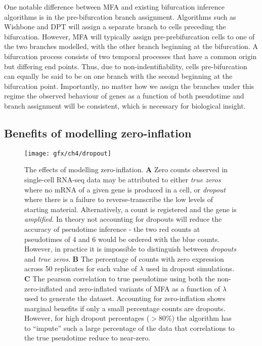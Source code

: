 One notable difference between MFA and existing bifurcation inference algorithms is in the pre-bifurcation branch assignment. Algorithms such as Wishbone and DPT will assign a separate branch to cells preceding the bifurcation. However, MFA will typically assign pre-prebifurcation cells to one of the two branches modelled, with the other branch beginning at the bifurcation. A bifurcation process consists of two temporal processes that have a common origin but differing end points. Thus, due to non-indentifiability, cells pre-bifurcation can equally be said to be on one branch with the second beginning at the bifurcation point. Importantly, no matter how we assign the branches under this regime the observed behaviour of genes as a function of both pseudotime and branch assignment will be consistent, which is necessary for biological insight.

\subsection{Benefits of modelling zero-inflation}

\begin{figure}
	\centering
	\texttt{[image: gfx/ch4/dropout]}
	\caption{The effects of modelling zero-inflation. {\normalfont
\textbf{A} Zero counts observed in single-cell RNA-seq data may be attributed to either \emph{true zeros} where no mRNA of a given gene is produced in a cell, or \emph{dropout} where there is a failure to reverse-transcribe the low levels of starting material. Alternatively, a count is registered and the gene is \emph{amplified}. In theory not accounting for dropouts will reduce the accuracy of pseudotime inference - the two red counts at pseudotimes of 4 and 6 would be ordered with the blue counts. However, in practice it is impossible to distinguish between \emph{dropouts} and \emph{true zeros}.
\textbf{B} The percentage of counts with zero expression across 50 replicates for each value of $\lambda$ used in dropout simulations.
\textbf{C} The pearson correlation to true pseudotime using both the non-zero-inflated and zero-inflated variants of MFA as a function of $\lambda$ used to generate the dataset. Accounting for zero-inflation shows marginal benefits if only a small percentage counts are dropouts. However, for high dropout percentages ($>80\%$) the algorithm has to ``impute'' such a large percentage of the data that correlations to the true pseudotime reduce to near-zero.
	}} \label{fig:dropout_results}
\end{figure}

